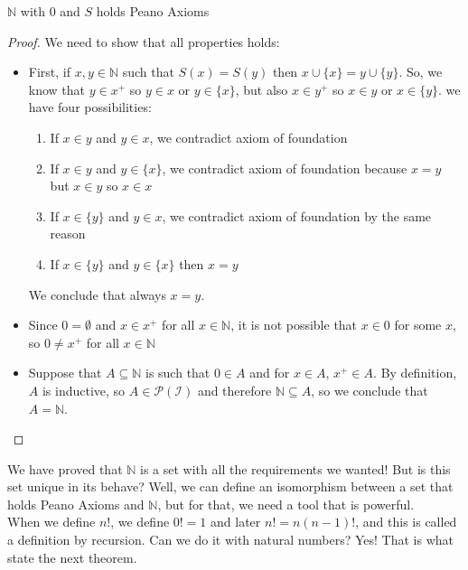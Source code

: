 \documentclass{tufte-handout}
\begin{document}
\begin{theorem}
	$\mathbb{N}$ with $0$ and $S$ holds Peano Axioms
\end{theorem}
\begin{proof}
	We need to show that all properties holds:
	\begin{itemize}
		\item First, if $x, y \in \mathbb{N}$ such that $S(x) = S(y)$ then $x \cup \{x\} = y \cup \{y\}$. So, we know that $y\in x^+$ so $y \in x$ or $y \in \{x\}$, but also $x \in y^+$ so $x \in y$ or $x \in \{y\}$. we have four possibilities:
		\begin{enumerate}
			\item If $x \in y$ and $y \in x$, we contradict axiom of foundation
			\item If $x \in y$ and $y \in \{x\}$, we contradict axiom of foundation because $x = y$ but $x \in y$ so $x \in x$
			\item If $x \in \{y\}$ and $y \in x$, we contradict axiom of foundation by the same reason
			\item If $x \in \{y\}$ and $y \in \{x\}$ then $x = y$
		\end{enumerate}
		We conclude that always $x = y$.
		\item Since $0 = \emptyset$ and $x \in x^+$ for all $x \in \mathbb{N}$, it is not possible that $x \in 0$ for some $x$, so $0 \neq x^+$ for all $x \in \mathbb{N}$
		\item Suppose that $A \subseteq \mathbb{N}$ is such that $0 \in A$ and for $x \in A$, $x^+ \in A$. By definition, $A$ is inductive, so $A \in \mathcal{P(\mathcal{I})}$ and therefore $\mathbb{N} \subseteq A$, so we conclude that $A = \mathbb{N}$.
	\end{itemize}
\end{proof}

We have proved that $\mathbb{N}$ is a set with all the requirements we wanted! But is this set unique in its behave? Well, we can define an isomorphism between a set that holds Peano Axioms and $\mathbb{N}$, but for that, we need a tool that is powerful.\\

When we define $n!$, we define $0! =1$ and later $n! = n(n-1)!$, and this is called a definition by recursion. Can we do it with natural numbers? Yes! That is what state the next theorem.
\end{document}
